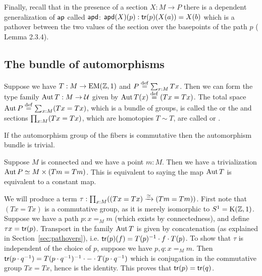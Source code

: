 Finally, recall that in the presence of a section \( X:M\to P \) there is a dependent generalization of \( \mathsf{ap} \) called \( \mathsf{apd} \): \( \mathsf{apd}(X)(p):\mathsf{tr}(p)(X(a))=X(b) \) which is a pathover between the two values of the section over the basepoints of the path \( p \) (\cite{hottbook} Lemma 2.3.4).

\subsection{The bundle of automorphisms}
\label{sec:automorphisms}
\begin{mydef}
Suppose we have \( T:M\to\mathrm{EM}(\mathbb{Z},1) \) and \( P\stackrel{\mathrm{def}}{=}\sum_{x:M}Tx \). Then we can form the type family \( \operatorname{Aut} T:M\to\mathcal{U} \) given by \( \operatorname{Aut} T(x)\stackrel{\mathrm{def}}{=}(Tx=Tx) \). The total space \( \operatorname{Aut} P\stackrel{\mathrm{def}}{=}\sum_{x:M}(Tx=Tx) \), which is a bundle of groups, is called the  or the  and sections \( \prod_{x:M}(Tx=Tx) \), which are homotopies \( T\sim T \), are called  or .
\end{mydef}

If the automorphism group of the fibers is commutative then the automorphism bundle is trivial.

\begin{mylemma}
\label{lem:gauge_triv}
Suppose \( M \) is connected and we have a point \( m:M \). Then we have a trivialization \( \operatorname{Aut} P\simeq M\times (Tm=Tm) \). This is equivalent to saying the map \( \operatorname{Aut} T \) is equivalent to a constant map.
\end{mylemma}
\begin{myproof}
We will produce a term \( \tau:\prod_{x:M}((Tx=Tx)\xrightarrow[]{\simeq}(Tm=Tm)) \). First note that \( (Tx=Tx) \) is a commutative group, as it is merely isomorphic to \( S^1=\mathrm{K}(\mathbb{Z},1) \). Suppose we have a path \( p:x=_M m \) (which exists by connectedness), and define \( \tau x=\mathsf{tr}(p) \). Transport in the family \( \operatorname{Aut} T \) is given by concatenation (as explained in Section~\ref{sec:pathovers}), i.e. \( \mathsf{tr}(p)(f)=T(p)^{-1}\cdot f\cdot T(p) \). To show that \( \tau \) is independent of the choice of \( p \), suppose we have \( p,q:x=_M m \). Then \( \mathsf{tr}(p\cdot q^{-1})=T(p\cdot q^{-1})^{-1}\cdot -\cdot T(p\cdot q^{-1}) \) which is conjugation in the commutative group \( Tx=Tx \), hence is the identity. This proves that \( \mathsf{tr}(p)=\mathsf{tr}(q) \).
\end{myproof}
